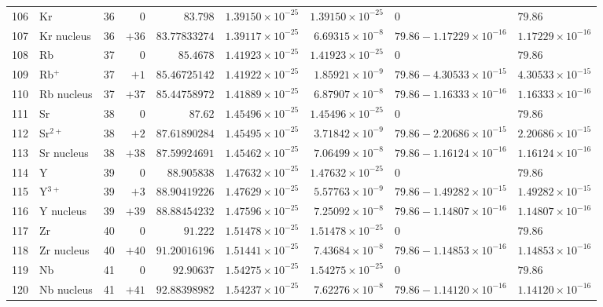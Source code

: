 {\begin{tabular}{@{}r l r r r r r l l@{}}
106 & Kr & 36 & $0$ & $83.798$ & $1.39150{\times}10^{-25}$ & $1.39150{\times}10^{-25}$ & $0$ & $79.86$ \\
107 & Kr nucleus & 36 & $+36$ & $83.77833274$ & $1.39117{\times}10^{-25}$ & $6.69315{\times}10^{-8}$ & $79.86 - 1.17229{\times}10^{-16}$ & $1.17229{\times}10^{-16}$ \\
108 & Rb & 37 & $0$ & $85.4678$ & $1.41923{\times}10^{-25}$ & $1.41923{\times}10^{-25}$ & $0$ & $79.86$ \\
109 & Rb$^{+}$ & 37 & $+1$ & $85.46725142$ & $1.41922{\times}10^{-25}$ & $1.85921{\times}10^{-9}$ & $79.86 - 4.30533{\times}10^{-15}$ & $4.30533{\times}10^{-15}$ \\
110 & Rb nucleus & 37 & $+37$ & $85.44758972$ & $1.41889{\times}10^{-25}$ & $6.87907{\times}10^{-8}$ & $79.86 - 1.16333{\times}10^{-16}$ & $1.16333{\times}10^{-16}$ \\
111 & Sr & 38 & $0$ & $87.62$ & $1.45496{\times}10^{-25}$ & $1.45496{\times}10^{-25}$ & $0$ & $79.86$ \\
112 & Sr$^{2+}$ & 38 & $+2$ & $87.61890284$ & $1.45495{\times}10^{-25}$ & $3.71842{\times}10^{-9}$ & $79.86 - 2.20686{\times}10^{-15}$ & $2.20686{\times}10^{-15}$ \\
113 & Sr nucleus & 38 & $+38$ & $87.59924691$ & $1.45462{\times}10^{-25}$ & $7.06499{\times}10^{-8}$ & $79.86 - 1.16124{\times}10^{-16}$ & $1.16124{\times}10^{-16}$ \\
114 & Y & 39 & $0$ & $88.905838$ & $1.47632{\times}10^{-25}$ & $1.47632{\times}10^{-25}$ & $0$ & $79.86$ \\
115 & Y$^{3+}$ & 39 & $+3$ & $88.90419226$ & $1.47629{\times}10^{-25}$ & $5.57763{\times}10^{-9}$ & $79.86 - 1.49282{\times}10^{-15}$ & $1.49282{\times}10^{-15}$ \\
116 & Y nucleus & 39 & $+39$ & $88.88454232$ & $1.47596{\times}10^{-25}$ & $7.25092{\times}10^{-8}$ & $79.86 - 1.14807{\times}10^{-16}$ & $1.14807{\times}10^{-16}$ \\
117 & Zr & 40 & $0$ & $91.222$ & $1.51478{\times}10^{-25}$ & $1.51478{\times}10^{-25}$ & $0$ & $79.86$ \\
118 & Zr nucleus & 40 & $+40$ & $91.20016196$ & $1.51441{\times}10^{-25}$ & $7.43684{\times}10^{-8}$ & $79.86 - 1.14853{\times}10^{-16}$ & $1.14853{\times}10^{-16}$ \\
119 & Nb & 41 & $0$ & $92.90637$ & $1.54275{\times}10^{-25}$ & $1.54275{\times}10^{-25}$ & $0$ & $79.86$ \\
120 & Nb nucleus & 41 & $+41$ & $92.88398982$ & $1.54237{\times}10^{-25}$ & $7.62276{\times}10^{-8}$ & $79.86 - 1.14120{\times}10^{-16}$ & $1.14120{\times}10^{-16}$ \\

\end{tabular}}
